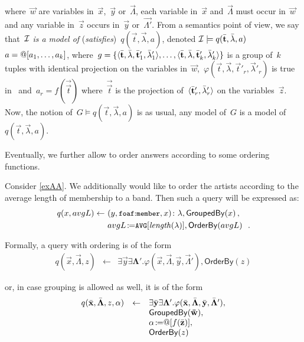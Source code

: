 \nd where~$\vec{w}$ are variables in~$\vec{x}$,~$\vec{y}$ or~$\vec{\Lambda}$, each variable in~$\vec{x}$
and~$\vec{\Lambda}$ must occur in~$\vec{w}$ and any variable in~$\vec{z}$ occurs in~$\vec{y}$ or~$\vec{\Lambda'}$.
%
From a semantics point of view, we say that~$\mathcal{I}$ \emph{is a model of} (\emph{satisfies})~$q(\vec{t},\vec{\lambda}, a)$,
denoted $\mathcal{I} \models q(\bar{\mathbf t},\bar{\mathbf \lambda}, a)$ \iff
%
$a = @ [a_{1}, \ldots, a_{k}]$, where~$g = \{ \langle \bar{\mathbf t}, \bar{\mathbf \lambda}, \bar{\mathbf t}'_{1},\bar{\mathbf \lambda}'_{1} \rangle,
\ldots , \langle \bar{\mathbf t}, \bar{\mathbf \lambda}, \bar{\mathbf t}'_{k},\bar{\mathbf \lambda}_{k}' \rangle \}$ is a group of~$k$ tuples with identical
projection on the variables in~$\vec{w}$,~$\varphi(\vec{t}, \vec{\lambda}, \vec{t}'_{r},\vec{\lambda}'_{r})$ is true in~\I
and~$a_{r} =f(\vec{\vec{t}})$ where~$\vec{\vec{t}}$ is the projection of~$\langle \bar{\mathbf t}'_{r}, \bar{\mathbf \lambda}'_{r} \rangle$ on the
variables~$\vec{z}$.
%
Now, the notion of~$G \models q(\vec{t},\vec{\lambda}, a)$ is as usual, any model of~$G$ is a model
of~$q(\vec{t},\vec{\lambda}, a)$.

Eventually, we further allow to order answers according to some ordering functions.

\begin{example}
  \label{exx} 
  Consider \cref{exAA}. We additionally would like to order the artists according to the average length of
  membership to a band.  Then such a query will be expressed as: \vspace{-\abovedisplayskip}
  \begin{align*}
    \funcCall{q}{x,avgL} \leftarrow~& \fuzzyg{\triple{y, \qname{foaf}{member}, x}}{\lambda}, \funcCall{\mathsf{GroupedBy}}{x},\\
    & avgL \assign \keyword{AVG}[\funcCall{length}{\lambda}],\funcCall{\mathsf{OrderBy}}{avgL} \enspace .
  \end{align*}
\end{example}

\nd Formally, a query with ordering is of the form
\[
\begin{array}{lcl}
q(\vec{x}, \vec{\Lambda}, z) & \leftarrow & \exists \vec{y}\exists\mathbf{\Lambda}'.\varphi(\vec{x}, \vec{\Lambda}, \vec{y},\vec{\Lambda}'), \mathsf{OrderBy}(z)
\end{array}
\]


\nd or, in case grouping is allowed as well, it is of the form
\[
\begin{array}{lcl}
  q(\bar{\mathbf x}, \bar{\mathbf \Lambda},z, \alpha) & \leftarrow & \exists \bar{\mathbf y}\exists\mathbf{\Lambda}'.\varphi(\bar{\mathbf x}, \bar{\mathbf \Lambda}, \bar{\mathbf y},\bar{\mathbf \Lambda}'),\\
                                      &            & \mathsf{GroupedBy(\bar{\mathbf w})},\\
                                      &            & \alpha \mbox{$\colon\!\!\!\!=$}@[f(\bar{\mathbf z})],\\
                                      &            & \mathsf{OrderBy}(z)
\end{array}
\]


